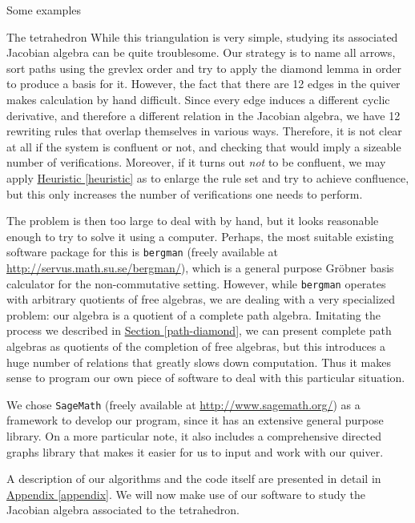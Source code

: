 \begin{chapter}{Some examples}
\begin{section}{The tetrahedron}
While this triangulation is very simple, studying its associated Jacobian algebra can be quite troublesome. Our strategy is to name all arrows, sort paths using the grevlex order and try to apply the diamond lemma in order to produce a basis for it. However, the fact that there are 12 edges in the quiver makes calculation by hand difficult. Since every edge induces a different cyclic derivative, and therefore a different relation in the Jacobian algebra, we have 12 rewriting rules that overlap themselves in various ways. Therefore, it is not clear at all if the system is confluent or not, and checking that would imply a sizeable number of verifications. Moreover, if it turns out \emph{not} to be confluent, we may apply \hyperref[heuristic]{Heuristic \ref*{heuristic}} as to enlarge the rule set and try to achieve confluence, but this only increases the number of verifications one needs to perform.

The problem is then too large to deal with by hand, but it looks reasonable enough to try to solve it using a computer. Perhaps, the most suitable existing software package for this is \texttt{bergman} (freely available at \url{http://servus.math.su.se/bergman/}), which is a general purpose Gröbner basis calculator for the non-commutative setting. However, while \texttt{bergman} operates with arbitrary quotients of free algebras, we are dealing with a very specialized problem: our algebra is a quotient of a complete path algebra. Imitating the process we described in \hyperref[path-diamond]{Section \ref*{path-diamond}}, we can present complete path algebras as quotients of the completion of free algebras, but this introduces a huge number of relations that greatly slows down computation. Thus it makes sense to program our own piece of software to deal with this particular situation.

We chose \texttt{SageMath} (freely available at \url{http://www.sagemath.org/}) as a framework to develop our program, since it has an extensive general purpose library. On a more particular note, it also includes a comprehensive directed graphs library that makes it easier for us to input and work with our quiver.

A description of our algorithms and the code itself are presented in detail in \hyperref[appendix]{Appendix \ref*{appendix}}. We will now make use of our software to study the Jacobian algebra associated to the tetrahedron.


\end{section}
\end{chapter}
